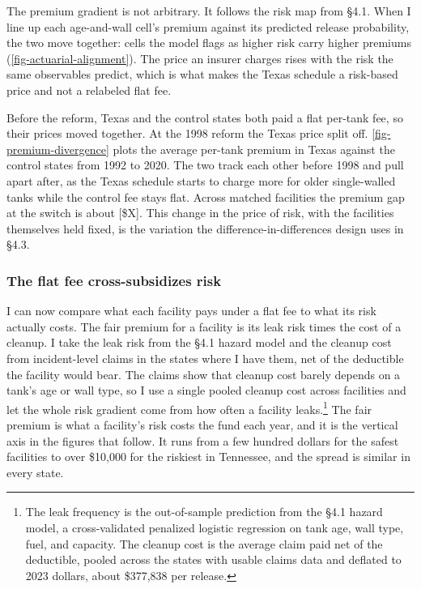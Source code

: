 \documentclass[
  12pt,
]{article}
\begin{document}
The premium gradient is not arbitrary. It follows the risk map from
§4.1. When I line up each age-and-wall cell's premium against its
predicted release probability, the two move together: cells the model
flags as higher risk carry higher premiums
(\autoref{fig-actuarial-alignment}). The price an insurer charges rises
with the risk the same observables predict, which is what makes the
Texas schedule a risk-based price and not a relabeled flat fee.

Before the reform, Texas and the control states both paid a flat
per-tank fee, so their prices moved together. At the 1998 reform the
Texas price split off. \autoref{fig-premium-divergence} plots the
average per-tank premium in Texas against the control states from 1992
to 2020. The two track each other before 1998 and pull apart after, as
the Texas schedule starts to charge more for older single-walled tanks
while the control fee stays flat. Across matched facilities the premium
gap at the switch is about {[}\$X{]}. This change in the price of risk,
with the facilities themselves held fixed, is the variation the
difference-in-differences design uses in §4.3.

\subsubsection{The flat fee cross-subsidizes
risk}\label{the-flat-fee-cross-subsidizes-risk}

I can now compare what each facility pays under a flat fee to what its
risk actually costs. The fair premium for a facility is its leak risk
times the cost of a cleanup. I take the leak risk from the §4.1 hazard
model and the cleanup cost from incident-level claims in the states
where I have them, net of the deductible the facility would bear. The
claims show that cleanup cost barely depends on a tank's age or wall
type, so I use a single pooled cleanup cost across facilities and let
the whole risk gradient come from how often a facility leaks.\footnote{The
  leak frequency is the out-of-sample prediction from the §4.1 hazard
  model, a cross-validated penalized logistic regression on tank age,
  wall type, fuel, and capacity. The cleanup cost is the average claim
  paid net of the deductible, pooled across the states with usable
  claims data and deflated to 2023 dollars, about \$377,838 per release.}
The fair premium is what a facility's risk costs the fund each year, and
it is the vertical axis in the figures that follow. It runs from a few
hundred dollars for the safest facilities to over \$10,000 for the
riskiest in Tennessee, and the spread is similar in every state.
\end{document}
